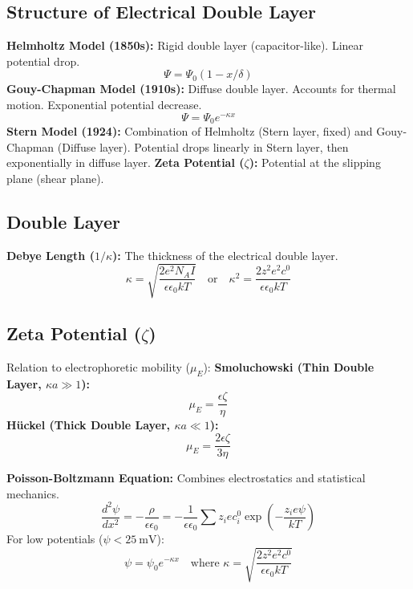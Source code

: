 \subsection{Structure of Electrical Double Layer}
\textbf{Helmholtz Model (1850s):}
Rigid double layer (capacitor-like). Linear potential drop.
\begin{equation}
    \Psi = \Psi_0 (1 - x/\delta)
\end{equation}
\textbf{Gouy-Chapman Model (1910s):}
Diffuse double layer. Accounts for thermal motion. Exponential potential decrease.
\begin{equation}
    \Psi = \Psi_0 e^{-\kappa x}
\end{equation}
\textbf{Stern Model (1924):}
Combination of Helmholtz (Stern layer, fixed) and Gouy-Chapman (Diffuse layer).
Potential drops linearly in Stern layer, then exponentially in diffuse layer.
\textbf{Zeta Potential ($\zeta$):} Potential at the slipping plane (shear plane).

\subsection{Double Layer}
\textbf{Debye Length ($1/\kappa$):}
The thickness of the electrical double layer.
\begin{equation}
    \kappa = \sqrt{\frac{2 e^2 N_A I}{\epsilon \epsilon_0 k T}} \quad \text{or} \quad \kappa^2 = \frac{2 z^2 e^2 c^0}{\epsilon \epsilon_0 k T}
\end{equation}

\subsection{Zeta Potential ($\zeta$)}
Relation to electrophoretic mobility ($\mu_E$):
\textbf{Smoluchowski (Thin Double Layer, $\kappa a \gg 1$):}
\begin{equation}
    \mu_E = \frac{\epsilon \zeta}{\eta}
\end{equation}
\textbf{Hückel (Thick Double Layer, $\kappa a \ll 1$):}
\begin{equation}
    \mu_E = \frac{2 \epsilon \zeta}{3 \eta}
\end{equation}

\textbf{Poisson-Boltzmann Equation:}
Combines electrostatics and statistical mechanics.
\begin{equation}
    \frac{d^2 \psi}{dx^2} = -\frac{\rho}{\epsilon \epsilon_0} = -\frac{1}{\epsilon \epsilon_0} \sum z_i e c_i^0 \exp \left( -\frac{z_i e \psi}{kT} \right)
\end{equation}
For low potentials ($\psi < \SI{25}{\mV}$):
\begin{equation}
    \psi = \psi_0 e^{-\kappa x} \quad \text{where } \kappa = \sqrt{\frac{2 z^2 e^2 c^0}{\epsilon \epsilon_0 k T}}
\end{equation}

